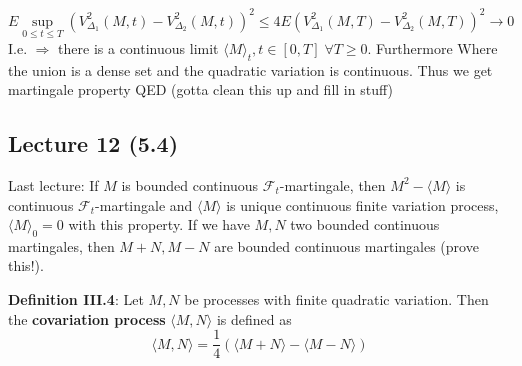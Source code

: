 \documentclass[english]{article}
\newcommand{\note}[1]{\noindent\textbf{#1}}
\newcommand{\F}{\mathcal F}
\begin{document}
$$E\sup_{0\leq t \leq T} (V^2_{\Delta_1}(M,t) - V^2_{\Delta_2} (M,t))^2 \leq 4 E(V^2_{\Delta_1}(M,T) - V^2_{\Delta_2}(M,T))^2 \to 0$$
I.e. $\Rightarrow$ there is a continuous limit $\langle M\rangle_t, t\in [0,T]\; \forall T\geq 0$. Furthermore 
Where the union is a dense set and the quadratic variation is continuous. Thus we get
martingale property
QED (gotta clean this up and fill in stuff)

\subsection*{Lecture 12 (5.4)}
Last lecture: If $M$ is bounded continuous $\F_t$-martingale, then $M^2 - \langle M \rangle$ is continuous $\F_t$-martingale and $\langle M \rangle$ is unique continuous finite variation process, $\langle M \rangle_0 = 0$ with this property. \newline
If we have $M,N$ two bounded continuous martingales, then $M+N, M-N$ are bounded continuous martingales (prove this!). \newline

\note{Definition III.4}: Let $M,N$ be processes with finite quadratic variation. Then the \textbf{covariation process} $\langle M, N \rangle$ is defined as
$$\langle M,N \rangle = \frac 14 ( \langle M+N \rangle - \langle M-N\rangle)$$
\end{document}

